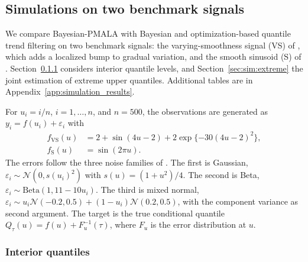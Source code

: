 \subsection{Simulations on two benchmark signals}
\label{sec:simulations}

We compare Bayesian-PMALA with Bayesian and optimization-based quantile trend filtering on two benchmark signals: the varying-smoothness signal (VS) of \citet{onizuka2024fast}, which adds a localized bump to gradual variation, and the smooth sinusoid (S) of \citet{brantley2020baseline}. Section~\ref{sec:sim:individual} considers interior quantile levels, and Section~\ref{sec:sim:extreme} the joint estimation of extreme upper quantiles. Additional tables are in Appendix~\ref{app:simulation_results}.

For $u_i=i/n$, $i=1,\ldots,n$, and $n=500$, the observations are generated as $y_i=f(u_i)+\varepsilon_i$ with
\begin{align}
 f_{\mathrm{VS}}(u)&=2+\sin(4u-2)+2\exp\{-30(4u-2)^2\},
 \label{eq:sim_vs}\\
 f_{\mathrm{S}}(u)&=\sin(2\pi u).
 \label{eq:sim_s}
\end{align}
The errors follow the three noise families of \citet{onizuka2024fast}. The first is Gaussian, $\varepsilon_i\sim\mathcal{N}(0,s(u_i)^2)$ with $s(u)=(1+u^2)/4$. The second is Beta, $\varepsilon_i\sim\mathrm{Beta}(1,11-10u_i)$. The third is mixed normal, $\varepsilon_i\sim u_i\mathcal{N}(-0.2,0.5)+(1-u_i)\mathcal{N}(0.2,0.5)$, with the component variance as second argument. The target is the true conditional quantile $Q_\tau(u)=f(u)+F_u^{-1}(\tau)$, where $F_u$ is the error distribution at $u$.

\subsubsection{Interior quantiles}
\label{sec:sim:individual}

